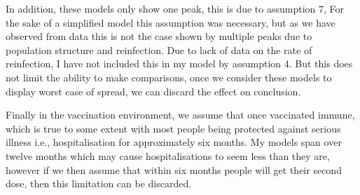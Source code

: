 \documentclass[11pt]{article}
\begin{document}
In addition, these models only show one peak, this is due to assumption $7$, For the sake of a simplified model this assumption was necessary, but as we have observed from data this is not the case shown by multiple peaks due to population structure and reinfection. Due to lack of data on the rate of reinfection, I have not included this in my model by assumption $4$. But this does not limit the ability to make comparisons, once we consider these models to display worst case of spread, we can discard the effect on conclusion. \par
Finally in the vaccination environment, we assume that once vaccinated immune, which is true to some extent with most people being protected against serious illness i.e., hospitalisation for approximately six months\citep{WHOVaccine}. My models span over twelve months which may cause hospitalisations to seem less than they are, however if we then assume that within six months people will get their second dose, then this limitation can be discarded.
\end{document}
